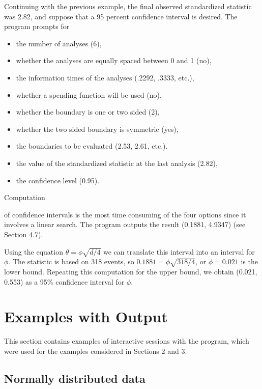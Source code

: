Continuing with the previous example, the final observed standardized
statistic was 2.82, and suppose that a 95 percent confidence interval is
desired.  The program prompts for {\singlespace
\vspace*{-1em}
  \begin{itemize}
    \item the number of analyses (6),
    \item whether the analyses are equally spaced between 0 and 1 (no),
    \item the information times of the analyses (.2292, .3333, etc.),
    \item whether a spending function will be used (no),
    \item whether the boundary is one or two sided (2),
    \item whether the two sided boundary is symmetric (yes),
    \item the boundaries to be evaluated (2.53, 2.61, etc.).
    \item the value of the standardized statistic at the last analysis
          (2.82),
    \item the confidence level (0.95).
  \end{itemize}
Computation} of confidence intervals is the most time consuming of the
four options since it involves a linear search.  The program outputs the
result (0.1881, 4.9347) (see Section 4.7).

Using the equation $\theta = \phi \sqrt{d/4}$ we can translate this
interval into an interval for $\phi$.  The statistic is based on 318
events, so $0.1881 = \phi \sqrt{318/4}$, or $\phi = 0.021$ is
the lower bound.  Repeating this computation for the upper bound, we obtain
(0.021, 0.553) as a 95\% confidence interval for $\phi$.


\section{Examples with Output}
\label{sec-examples}

This section contains examples of interactive sessions with the
program, which were used for the examples considered in Sections 2 and
3.

\subsection{Normally distributed data}

